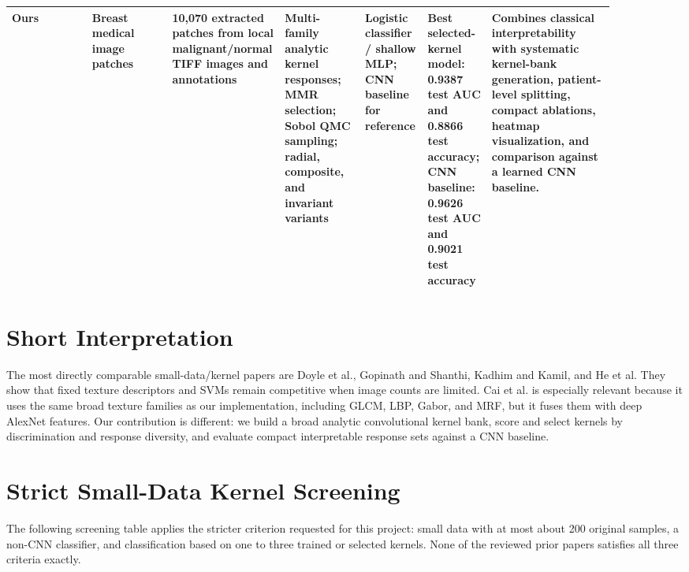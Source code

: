 \documentclass[9pt]{article}
\begin{document}
\begin{longtable}{p{0.13\linewidth}p{0.13\linewidth}p{0.10\linewidth}p{0.13\linewidth}p{0.10\linewidth}p{0.10\linewidth}p{0.20\linewidth}}

Ours & Breast medical image patches & 10,070 extracted patches from local malignant/normal TIFF images and annotations & Multi-family analytic kernel responses; MMR selection; Sobol QMC sampling; radial, composite, and invariant variants & Logistic classifier / shallow MLP; CNN baseline for reference & Best selected-kernel model: 0.9387 test AUC and 0.8866 test accuracy; CNN baseline: 0.9626 test AUC and 0.9021 test accuracy & Combines classical interpretability with systematic kernel-bank generation, patient-level splitting, compact ablations, heatmap visualization, and comparison against a learned CNN baseline. \\

\bottomrule
\end{longtable}

\normalsize
\section*{Short Interpretation}

The most directly comparable small-data/kernel papers are Doyle et al., Gopinath and Shanthi, Kadhim and Kamil, and He et al. They show that fixed texture descriptors and SVMs remain competitive when image counts are limited. Cai et al. is especially relevant because it uses the same broad texture families as our implementation, including GLCM, LBP, Gabor, and MRF, but it fuses them with deep AlexNet features. Our contribution is different: we build a broad analytic convolutional kernel bank, score and select kernels by discrimination and response diversity, and evaluate compact interpretable response sets against a CNN baseline.

\section*{Strict Small-Data Kernel Screening}

The following screening table applies the stricter criterion requested for this project: small data with at most about 200 original samples, a non-CNN classifier, and classification based on one to three trained or selected kernels. None of the reviewed prior papers satisfies all three criteria exactly.
\end{document}
